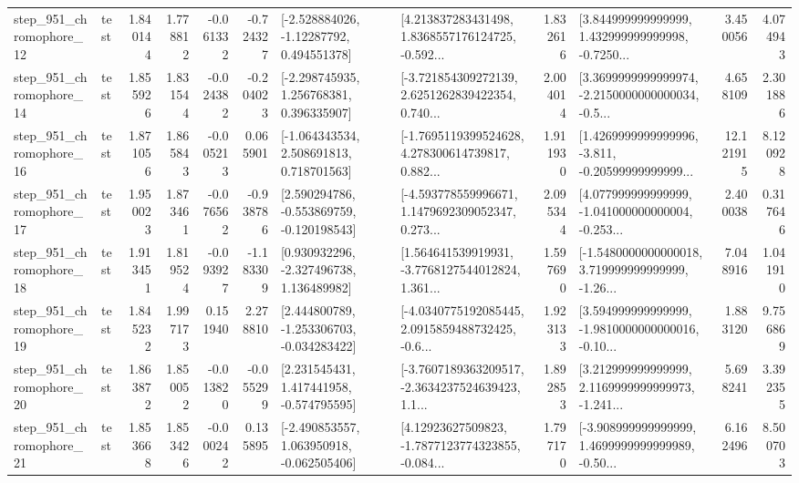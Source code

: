 \begin{tabular}{llrrrrllrlrr}
  step\_951\_chromophore\_12 &      test &      1.840144 &    1.778812 &     -0.061332 & -0.724327 &    [-2.528884026, -1.12287792, 0.494551378] &  [4.213837283431498, 1.8368557176124725, -0.592... &       1.832616 &  [3.844999999999999, 1.432999999999998, -0.7250... &            3.450056 &          4.074943 \\
  step\_951\_chromophore\_14 &      test &      1.855926 &    1.831544 &     -0.024382 & -0.204023 &    [-2.298745935, 1.256768381, 0.396335907] &  [-3.721854309272139, 2.6251262839422354, 0.740... &       2.004014 &  [3.3699999999999974, -2.2150000000000034, -0.5... &            4.658109 &          2.301886 \\
  step\_951\_chromophore\_16 &      test &      1.871056 &    1.865843 &     -0.005213 &  0.065901 &    [-1.064343534, 2.508691813, 0.718701563] &  [-1.7695119399524628, 4.278300614739817, 0.882... &       1.911930 &  [1.4269999999999996, -3.811, -0.20599999999999... &           12.121915 &          8.120928 \\
  step\_951\_chromophore\_17 &      test &      1.950023 &    1.873461 &     -0.076562 & -0.938786 &   [2.590294786, -0.553869759, -0.120198543] &  [-4.593778559996671, 1.1479692309052347, 0.273... &       2.095344 &  [4.077999999999999, -1.041000000000004, -0.253... &            2.400038 &          0.317646 \\
  step\_951\_chromophore\_18 &      test &      1.913451 &    1.819524 &     -0.093927 & -1.183309 &    [0.930932296, -2.327496738, 1.136489982] &  [1.564641539919931, -3.7768127544012824, 1.361... &       1.597690 &  [-1.5480000000000018, 3.719999999999999, -1.26... &            7.048916 &          1.041910 \\
  step\_951\_chromophore\_19 &      test &      1.845232 &    1.997173 &      0.151940 &  2.278810 &   [2.444800789, -1.253306703, -0.034283422] &  [-4.0340775192085445, 2.0915859488732425, -0.6... &       1.923133 &  [3.594999999999999, -1.9810000000000016, -0.10... &            1.883120 &          9.756869 \\
  step\_951\_chromophore\_20 &      test &      1.863872 &    1.850052 &     -0.013820 & -0.055299 &    [2.231545431, 1.417441958, -0.574795595] &  [-3.7607189363209517, -2.3634237524639423, 1.1... &       1.892853 &  [3.212999999999999, 2.1169999999999973, -1.241... &            5.698241 &          3.392355 \\
  step\_951\_chromophore\_21 &      test &      1.853668 &    1.853426 &     -0.000242 &  0.135895 &   [-2.490853557, 1.063950918, -0.062505406] &  [4.12923627509823, -1.7877123774323855, -0.084... &       1.797170 &  [-3.908999999999999, 1.4699999999999989, -0.50... &            6.162496 &          8.500703 \\

\end{tabular}
